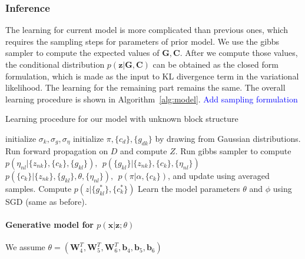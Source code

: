 \subsubsection{Inference}
The learning for current model is more complicated than previous ones, which requires the sampling steps for parameters of prior model. We use the gibbs sampler to compute the expected values of $\mathbf{G}, \mathbf{C}$. After we compute those values, the conditional distribution $p(\mathbf{z}|\mathbf{G},\mathbf{C})$ can be obtained as the closed form formulation, which is made as the input to KL divergence term in the variational likelihood. The learning for the remaining part remains the same. The overall learning procedure is shown in Algorithm~\ref{alg:model}.
\textcolor{blue}{Add sampling formulation}

\begin{algorithm}[t]
\caption{Learning procedure for our model with unknown block structure}\label{alg}
\begin{algorithmic}[1]
\STATE initialize $\sigma_k, \sigma_g, \sigma_{\eta}$
\STATE initialize $\pi, \{c_d\}, \{g_{dk}\}$ by drawing from Gaussian distributions.
\STATE Run forward propagation on $D$ and compute $Z$.
\STATE Run gibbs sampler to compute $p(\eta_{nl}|\{z_{nk}\}, \{c_k\}, \{g_{kl}\}), ~~p(\{g_{kl}\}|\{z_{nk}\},\{c_k\}, \{\eta_{nl}\})$\\
$p(\{c_k\}|\{z_{nk}\},\{g_{kl}\}, \theta, \{\eta_{nl}\}), ~~p(\pi|\alpha,\{c_k\})$, and update using averaged samples.
\STATE Compute $p(z|\{g_{kl}^*\},\{c_k^*\})$
\STATE Learn the model parameters $\theta$ and $\phi$ using SGD (same as before). 
\ENDFOR
\ENDFOR
\end{algorithmic}
\label{alg:model}
\end{algorithm}














\iffalse

\paragraph{Generative model for $p(\mathbf{x}|\mathbf{z};\theta)$}  We assume $\theta=(\mathbf{W}_4^T, \mathbf{W}_5^T,\mathbf{W}_6^T, \mathbf{b}_4, \mathbf{b}_5,\mathbf{b}_6)$


